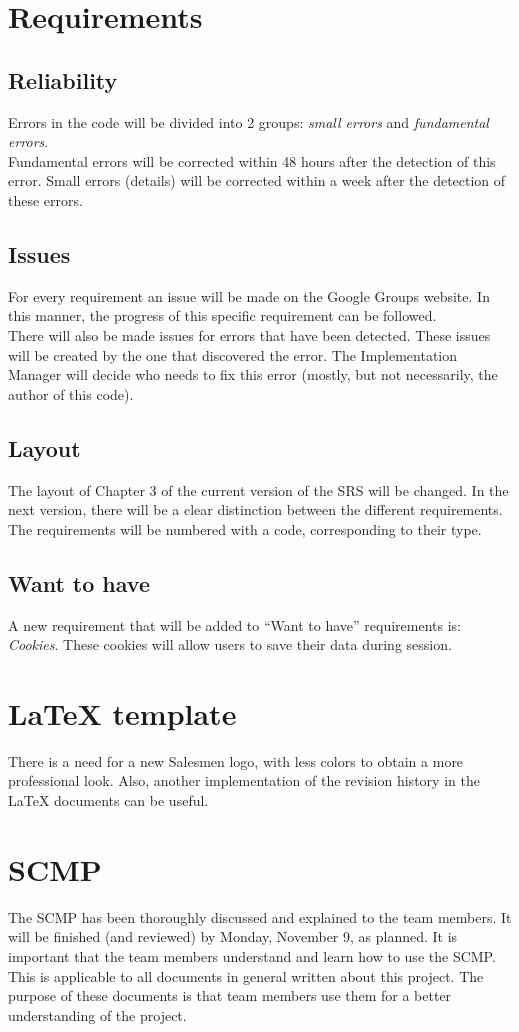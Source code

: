 \documentclass[a4paper, 12pt]{article}
\begin{document}
	\section{Requirements}
		\subsection{Reliability}
Errors in the code will be divided into 2 groups: \textit{small errors} and \textit{fundamental errors}. \\ Fundamental errors will be corrected within 48 hours after the detection of this error. Small errors (details) will be corrected within a week after the detection of these errors. 
		\subsection{Issues}
For every requirement an issue will be made on the Google Groups website\cite{site1}. In this manner, the progress of this specific requirement can be followed. \\ There will also be made issues for errors that have been detected. These issues will be created by the one that discovered the error.  The Implementation Manager will decide who needs to fix this error (mostly, but not necessarily, the author of this code).
		\subsection{Layout}
The layout of Chapter 3 of the current version of the SRS will be changed. In the next version, there will be a clear distinction between the different requirements. The requirements will be numbered with a code, corresponding to their type.
		\subsection{Want to have}
A new requirement that will be added to ``Want to have'' requirements is: \textit{Cookies}. These cookies will allow users to save their data during session.
	\section{\LaTeX{} template}
There is a need for a new Salesmen logo, with less colors to obtain a more professional look. Also, another implementation of the revision history in the \LaTeX{} documents can be useful.

	\section{SCMP}
The SCMP has been thoroughly discussed and explained to the team members. It will be finished (and reviewed) by Monday, November 9, as planned. It is important that the team members understand and learn how to use the SCMP. This is applicable to all documents in general written about this project. The purpose of these documents is that team members use them for a better understanding of the project.
\end{document}
